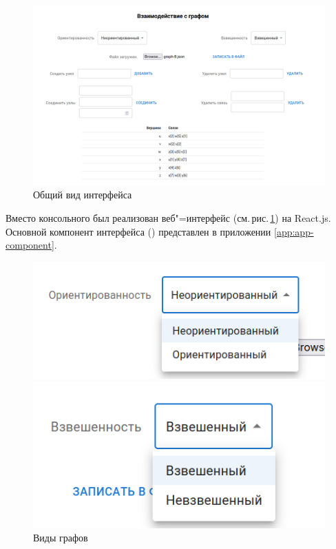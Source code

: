 \begin{figure}[H]
  \centering\includegraphics[width=1.0\textwidth]{figs/task-1/int-1.png}
  \caption{Общий вид интерфейса}
  \label{fig:int-overview}
\end{figure}

Вместо консольного был реализован веб"=интерфейс (см.\,рис.\,\ref{fig:int-overview})
на React.js. Основной компонент интерфейса () представлен в приложении
\ref{app:app-component}.

\begin{figure}[H]
  \begin{minipage}{0.5\textwidth}
    \centering\includegraphics[width=0.7\linewidth]{figs/task-1/int-2.png}
  \end{minipage}
  \begin{minipage}{0.5\textwidth}
    \centering\includegraphics[width=0.7\linewidth]{figs/task-1/int-3.png}
  \end{minipage}
  \caption{Виды графов}
  \label{fig:int-basic-params}
\end{figure}

